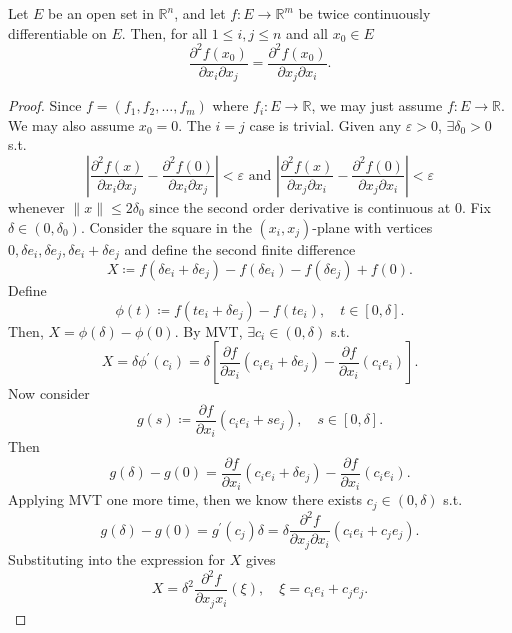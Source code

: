 \begin{theorem}
    Let \(E\) be an open set in \(\mathbb{R} ^n\), and let \(f: E \to \mathbb{R} ^m\) be twice continuously differentiable on \(E\). Then, for all \(1 \le i, j \le n\) and all \(x_0 \in E\)
    \[
        \frac{\partial^2 f(x_0)}{\partial x_i \partial x_j} = \frac{\partial^2 f(x_0) }{\partial x_j \partial x_i}.  
    \]      
\end{theorem}

\begin{proof}
    Since \(f = (f_1, f_2, \dots , f_m)\) where \(f_i : E \to \mathbb{R} \), we may just assume \(f: E \to \mathbb{R} \). We may also assume \(x_0 = 0\). The \(i = j\) case is trivial. Given any \(\varepsilon > 0\), \(\exists \delta _0 > 0\) s.t. 
    \[
        \left\vert \frac{\partial ^2 f(x)}{\partial x_i \partial x_j} - \frac{\partial ^2 f(0)}{\partial x_i \partial x_j} \right\vert < \varepsilon  \text{ and } \left\vert \frac{\partial ^2 f(x)}{\partial x_j \partial x_i} - \frac{\partial ^2 f(0)}{\partial x_j \partial x_i} \right\vert < \varepsilon 
    \] whenever \(\lVert x \rVert \le 2 \delta _0 \) since the second order derivative is continuous at \(0\). Fix \(\delta \in (0, \delta _0)\). Consider the square in the \((x_i, x_j)\)-plane with vertices \(0, \delta e_i, \delta e_j, \delta e_i + \delta e_j\) and define the second finite difference 
    \[
        X \coloneqq f(\delta e_i + \delta e_j) - f(\delta e_i) - f(\delta e_j) + f(0).
    \]          
    Define 
    \[
        \phi (t) \coloneqq f(t e_i + \delta e_j) - f(t e_i), \quad t \in [0, \delta ].
    \]
    Then, \(X = \phi (\delta ) - \phi (0)\). By MVT, \(\exists c_i \in (0, \delta )\) s.t. 
    \[
        X = \delta \phi ^{\prime} (c_i) = \delta \left[ \frac{\partial f}{\partial x_i} (c_i e_i + \delta e_j) - \frac{\partial f}{\partial x_i} (c_i e_i)    \right]. 
    \]  
    Now consider
    \[
        g(s) \coloneqq \frac{\partial f}{\partial x_i} (c_i e_i + s e_j), \quad s \in [0, \delta ].
    \]
    Then 
    \[
        g(\delta ) - g(0) = \frac{\partial f}{\partial x_i} (c_i e_i + \delta e_j) - \frac{\partial f}{\partial x_i} (c_i e_i). 
    \]
    Applying MVT one more time, then we know there exists \(c_j \in (0, \delta )\) s.t. 
    \[
        g(\delta ) - g(0) = g^{\prime} (c_j) \delta = \delta \frac{\partial^2 f}{\partial x_j \partial x_i} (c_i e_i + c_j e_j).
    \] 
    Substituting into the expression for \(X\) gives 
    \[
        X = \delta ^2 \frac{\partial^2 f}{\partial x_j x_i} (\xi), \quad \xi = c_i e_i + c_j e_j. 
    \]

\end{proof}
